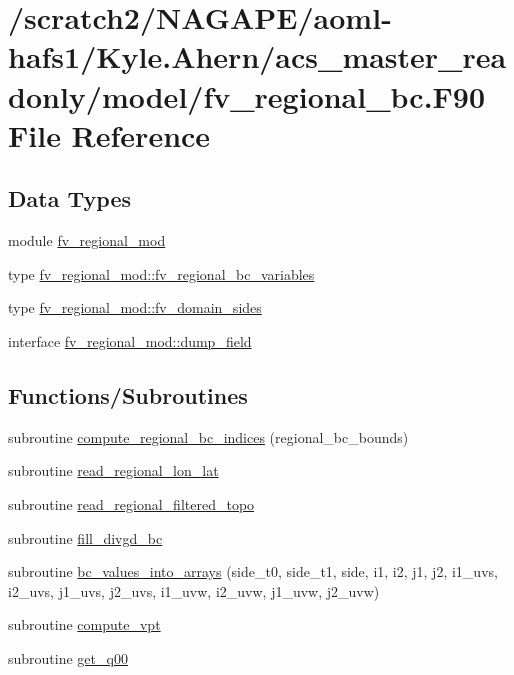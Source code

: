 \section{/scratch2/\-N\-A\-G\-A\-P\-E/aoml-\/hafs1/\-Kyle.Ahern/acs\-\_\-master\-\_\-readonly/model/fv\-\_\-regional\-\_\-bc.F90 File Reference}
\label{fv__regional__bc_8F90}
\subsection*{Data Types}
\begin{DoxyCompactItemize}
\item 
module \hyperlink{classfv__regional__mod}{fv\-\_\-regional\-\_\-mod}
\item 
type \hyperlink{structfv__regional__mod_1_1fv__regional__bc__variables}{fv\-\_\-regional\-\_\-mod\-::fv\-\_\-regional\-\_\-bc\-\_\-variables}
\item 
type \hyperlink{structfv__regional__mod_1_1fv__domain__sides}{fv\-\_\-regional\-\_\-mod\-::fv\-\_\-domain\-\_\-sides}
\item 
interface \hyperlink{interfacefv__regional__mod_1_1dump__field}{fv\-\_\-regional\-\_\-mod\-::dump\-\_\-field}
\end{DoxyCompactItemize}
\subsection*{Functions/\-Subroutines}
\begin{DoxyCompactItemize}
\item 
subroutine \hyperlink{fv__regional__bc_8F90_a638c4c6151ebbd4b5acbddf35746eb26}{compute\-\_\-regional\-\_\-bc\-\_\-indices} (regional\-\_\-bc\-\_\-bounds)
\item 
subroutine \hyperlink{fv__regional__bc_8F90_a09189d3b4fa4d19a5942bd7ff1cb26ec}{read\-\_\-regional\-\_\-lon\-\_\-lat}
\item 
subroutine \hyperlink{fv__regional__bc_8F90_a42821f6740373a4651a4eb14f8a8639b}{read\-\_\-regional\-\_\-filtered\-\_\-topo}
\item 
subroutine \hyperlink{fv__regional__bc_8F90_a500dc18823e751325f65a14ac026b531}{fill\-\_\-divgd\-\_\-bc}
\item 
subroutine \hyperlink{fv__regional__bc_8F90_a96cf4201092050374e4f866b1e36cb9a}{bc\-\_\-values\-\_\-into\-\_\-arrays} (side\-\_\-t0, side\-\_\-t1, side, i1, i2, j1, j2, i1\-\_\-uvs, i2\-\_\-uvs, j1\-\_\-uvs, j2\-\_\-uvs, i1\-\_\-uvw, i2\-\_\-uvw, j1\-\_\-uvw, j2\-\_\-uvw)
\item 
subroutine \hyperlink{fv__regional__bc_8F90_af7e4f6bf58503114a557595efd1eee24}{compute\-\_\-vpt}
\item 
subroutine \hyperlink{fv__regional__bc_8F90_a7e4db30594d915c5a1965b85476aea68}{get\-\_\-q00}
\end{DoxyCompactItemize}


